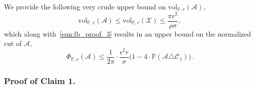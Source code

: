 \documentclass[11pt,twoside]{article}
\newcommand{\vol}{\mathrm{vol}}
\newcommand{\1}{\mathbf{1}}
\newcommand{\Pbb}{\mathbb{P}}
\newcommand{\Cset}{\mathcal{C}}
\newcommand{\Aset}{\mathcal{A}}
\begin{document}
We provide the following very crude upper bound on $\vol_{\Pbb,r}(\Aset)$,
\begin{equation*}
\vol_{\Pbb,r}(\Aset) \leq \vol_{\Pbb,r}(\mathcal{X}) \leq \frac{\pi r^2}{\rho \sigma},
\end{equation*}
which along with~\eqref{eqn:lb_proof_3} results in an upper bound on the normalized cut of $\Aset$,
\begin{equation*}
\Phi_{\Pbb,r}(\Aset) \leq \frac{1}{2\pi} \cdot \frac{\epsilon^2r}{\sigma} \bigl(1 - 4 \cdot \Pbb(\Aset \triangle \Cset_1 )\bigr).
\end{equation*}

\subsubsection{Proof of Claim 1.}
\end{document}
